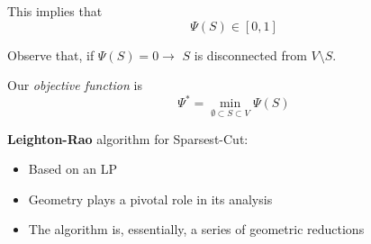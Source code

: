     This implies that
    \[ \Psi(S) \in [0,1] \]

    Observe that, if $\Psi(S) = 0 \rightarrow$ $S$ is disconnected from $V \setminus S$.

    Our \textit{objective function} is
    \[ \Psi^* = \min_{\emptyset \subset S \subset V} \Psi(S) \]

    \textbf{Leighton-Rao} algorithm for Sparsest-Cut:
    \begin{itemize}
        \item Based on an LP
        \item Geometry plays a pivotal role in its analysis
        \item The algorithm is, essentially, a series of geometric reductions
    \end{itemize}